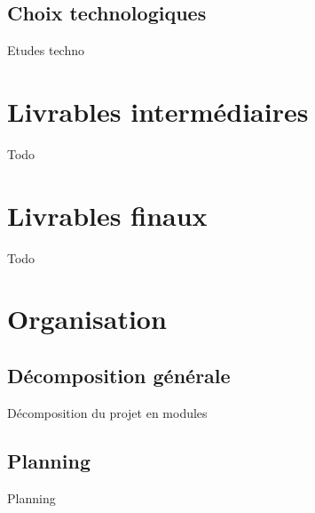 \documentclass[a4paper,10pt]{report}
\begin{document}
    \section{Choix technologiques}

      Etudes techno

  \chapter{Livrables intermédiaires}

    Todo

  \chapter{Livrables finaux}

    Todo

  \chapter{Organisation}

    \section{Décomposition générale}

      Décomposition du projet en modules

    \section{Planning}

      Planning
\end{document}

